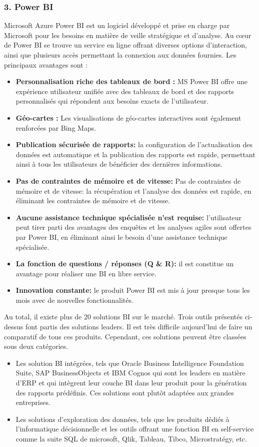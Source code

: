 \documentclass[french, a4paper, 12pt]{report}
\begin{document}
\subsubsection{3. Power BI}
Microsoft Azure Power BI est un logiciel développé et prise en charge par Microsoft pour les besoins en matière de veille stratégique et d'analyse. Au cœur de Power BI se trouve un service en ligne offrant diverses options d’interaction, ainsi que plusieurs accès permettant la connexion aux données fournies.
Les principaux avantages sont :
\begin{itemize}
\item \textbf{Personnalisation riche des tableaux de bord :}  MS Power BI offre une expérience utilisateur unifiée avec des tableaux de bord et des rapports personnalisés qui répondent aux besoins exacts de l'utilisateur. 
\item \textbf{Géo-cartes :} Les visualisations de géo-cartes interactives sont également renforcées par Bing Maps.
\item \textbf{Publication sécurisée de rapports:}  la configuration de l'actualisation des données est automatique et la publication des rapports est rapide, permettant ainsi à tous les utilisateurs de bénéficier des dernières informations.
\item \textbf{Pas de contraintes de mémoire et de vitesse:} Pas de contraintes de mémoire et de vitesse: la récupération et l’analyse des données est rapide, en éliminant les contraintes de mémoire et de vitesse.
\item \textbf{Aucune assistance technique spécialisée n’est requise:}  l’utilisateur peut tirer parti des avantages des enquêtes et les analyses agiles sont offertes par Power BI, en éliminant ainsi le besoin d’une assistance technique spécialisée.
\item \textbf{La fonction de questions / réponses (Q \& R):} il est constitue un avantage pour réaliser une BI en libre service.
\item \textbf{Innovation constante:}  le produit Power BI est mis à jour presque tous les mois avec de nouvelles fonctionnalités.\\
\end{itemize} 
Au total, il existe plus de 20 solutions BI sur le marché. Trois outils présentés ci-dessus font partis des solutions leaders. Il est très difficile aujourd’hui de faire un comparatif de tous ces produits. Cependant, ces solutions peuvent être classées sous deux catégories.
\begin{itemize}
\item \textbf{} Les solution BI intégrées, tels que Oracle Business Intelligence Foundation Suite, SAP BusinessObjects et IBM Cognos qui sont les leaders en matière d’ERP et qui intègrent leur couche BI dans leur produit pour la génération des rapports prédéfinis. Ces solutions sont plutôt adaptées aux grandes entreprises.
\item \textbf{} Les solutions d’exploration des données, tels que les produits dédiés à l’informatique décisionnelle et les outils offrant une fonction BI en self-service comme la suite SQL de microsoft, Qlik, Tableau, Tibco, Microstratégy, etc. 

\end{itemize} 
\end{document}
